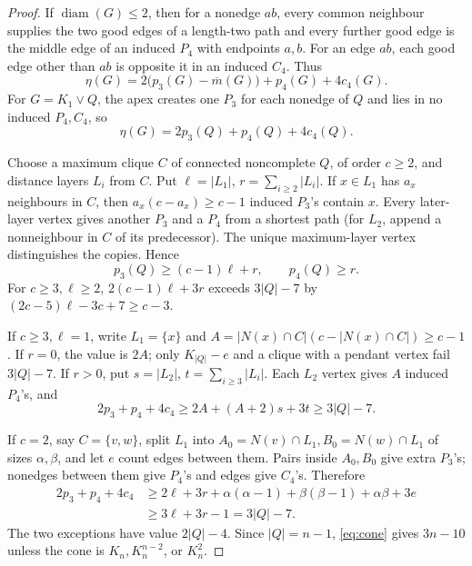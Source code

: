 \documentclass[11pt,a4paper]{article}
\theoremstyle{plain}
\theoremstyle{definition}
\theoremstyle{remark}
\begin{document}
\label{pf:universal}
\propuniversal*
\begin{proof}
If $\operatorname{diam}(G)\le2$, then for a nonedge $ab$, every common
neighbour supplies the two good edges of a length-two path and every
further good edge is the middle edge of an induced $P_4$ with endpoints
$a,b$. For an edge $ab$, each good edge other than $ab$ is opposite it
in an induced $C_4$. Thus
\begin{equation}\label{eq:diam2}
 \eta(G)=2\bigl(p_3(G)-\overline m(G)\bigr)+p_4(G)+4c_4(G).
\end{equation}
For $G=K_1\vee Q$, the apex creates one $P_3$ for each nonedge of $Q$ and
lies in no induced $P_4,C_4$, so
\begin{equation}\label{eq:cone}
 \eta(G)=2p_3(Q)+p_4(Q)+4c_4(Q).
\end{equation}

Choose a maximum clique $C$ of connected noncomplete $Q$, of order
$c\ge2$, and distance layers $L_i$ from $C$. Put
$\ell=|L_1|$, $r=\sum_{i\ge2}|L_i|$. If $x\in L_1$ has $a_x$ neighbours
in $C$, then $a_x(c-a_x)\ge c-1$ induced $P_3$'s contain $x$. Every
later-layer vertex gives another $P_3$ and a $P_4$ from a shortest path
(for $L_2$, append a nonneighbour in $C$ of its predecessor). The unique
maximum-layer vertex distinguishes the copies. Hence
\[
 p_3(Q)\ge(c-1)\ell+r,\qquad p_4(Q)\ge r.
\]
For $c\ge3,\ell\ge2$, $2(c-1)\ell+3r$ exceeds $3|Q|-7$ by
$(2c-5)\ell-3c+7\ge c-3$.

If $c\ge3,\ell=1$, write $L_1=\{x\}$ and
$A=|N(x)\cap C|(c-|N(x)\cap C|)\ge c-1$. If $r=0$, the value is $2A$;
only $K_{|Q|}-e$ and a clique with a pendant vertex fail $3|Q|-7$.
If $r>0$, put $s=|L_2|$, $t=\sum_{i\ge3}|L_i|$. Each $L_2$ vertex gives
$A$ induced $P_4$'s, and
\[
 2p_3+p_4+4c_4\ge2A+(A+2)s+3t\ge3|Q|-7.
\]

If $c=2$, say $C=\{v,w\}$, split $L_1$ into
$A_0=N(v)\cap L_1,B_0=N(w)\cap L_1$ of sizes $\alpha,\beta$, and let
$e$ count edges between them. Pairs inside $A_0,B_0$ give extra $P_3$'s;
nonedges between them give $P_4$'s and edges give $C_4$'s. Therefore
\[
\begin{aligned}
2p_3+p_4+4c_4
&\ge2\ell+3r+\alpha(\alpha-1)+\beta(\beta-1)+\alpha\beta+3e\\
&\ge3\ell+3r-1=3|Q|-7.
\end{aligned}
\]
The two exceptions have value $2|Q|-4$. Since $|Q|=n-1$,
\eqref{eq:cone} gives $3n-10$ unless the cone is
$K_n,K_n^{n-2}$, or $K_n^2$.
\end{proof}
\end{document}
